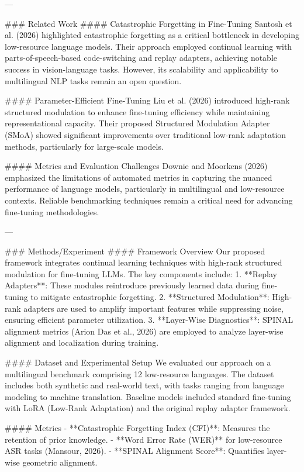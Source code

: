 ---

### Related Work  
#### Catastrophic Forgetting in Fine-Tuning  
Santosh et al. (2026) highlighted catastrophic forgetting as a critical bottleneck in developing low-resource language models. Their approach employed continual learning with parts-of-speech-based code-switching and replay adapters, achieving notable success in vision-language tasks. However, its scalability and applicability to multilingual NLP tasks remain an open question.  

#### Parameter-Efficient Fine-Tuning  
Liu et al. (2026) introduced high-rank structured modulation to enhance fine-tuning efficiency while maintaining representational capacity. Their proposed Structured Modulation Adapter (SMoA) showed significant improvements over traditional low-rank adaptation methods, particularly for large-scale models.  

#### Metrics and Evaluation Challenges  
Downie and Moorkens (2026) emphasized the limitations of automated metrics in capturing the nuanced performance of language models, particularly in multilingual and low-resource contexts. Reliable benchmarking techniques remain a critical need for advancing fine-tuning methodologies.  

---

### Methods/Experiment  
#### Framework Overview  
Our proposed framework integrates continual learning techniques with high-rank structured modulation for fine-tuning LLMs. The key components include:  
1. **Replay Adapters**: These modules reintroduce previously learned data during fine-tuning to mitigate catastrophic forgetting.  
2. **Structured Modulation**: High-rank adapters are used to amplify important features while suppressing noise, ensuring efficient parameter utilization.  
3. **Layer-Wise Diagnostics**: SPINAL alignment metrics (Arion Das et al., 2026) are employed to analyze layer-wise alignment and localization during training.  

#### Dataset and Experimental Setup  
We evaluated our approach on a multilingual benchmark comprising 12 low-resource languages. The dataset includes both synthetic and real-world text, with tasks ranging from language modeling to machine translation. Baseline models included standard fine-tuning with LoRA (Low-Rank Adaptation) and the original replay adapter framework.  

#### Metrics  
- **Catastrophic Forgetting Index (CFI)**: Measures the retention of prior knowledge.  
- **Word Error Rate (WER)** for low-resource ASR tasks (Mansour, 2026).  
- **SPINAL Alignment Score**: Quantifies layer-wise geometric alignment.  

